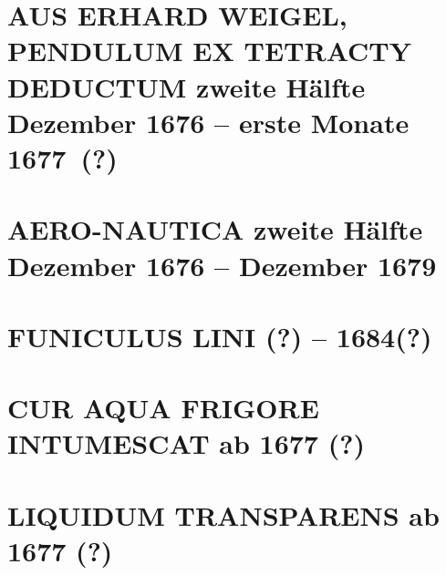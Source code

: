 \documentclass[%
fontsize=10pt,
]{scrbook}
\DeclareRobustCommand{\bracks}[1]{%
\textup{\lbrack}#1\textup{\rbrack}}
\begin{document}
\chapter[tocentry={Aus Erhard Weigel, Pendulum ex tetracty deductum 
\enskip \bracks{zweite Hälfte Dezember 1676 -- erste Monate 1677~(?)}},
head={Aus Erhard Weigel, Pendulum ex tetracty deductum}]%
{\MakeUppercase{Aus Erhard Weigel, Pendulum ex tetracty deductum}
\newline \bracks{zweite Hälfte Dezember 1676 -- erste Monate 1677~(?)}}
\label{38575}




\chapter[tocentry={Aero-nautica 
\enskip\bracks{zweite Hälfte Dezember 1676 -- Dezember 1679}},
head={Aero-nautica }]%
{\MakeUppercase{Aero-nautica}
\newline\bracks{zweite Hälfte Dezember 1676 -- Dezember 1679}}
\label{56215}




\chapter[tocentry={Funiculus Lini 
\enskip\lbrack%
1677\;(?) -- 1684\;(?)%
\rbrack},
head={Funiculus Lini}]%
{\MakeUppercase{Funiculus Lini}
\newline{}\;(?) -- 1684\;(?)%
\rbrack}%
\label{60261}




\chapter[tocentry={Cur aqua frigore intumescat %
\enskip\bracks{%
ab 1677 (?)%
}}, %
head={Cur aqua frigore intumescat%
}]%
{\MakeUppercase{Cur aqua frigore intumescat} %
\newline\bracks{%
ab 1677 (?)%
}}%
\label{60248}




\chapter[tocentry={Liquidum transparens %
\enskip\bracks{%
ab 1677 (?)%
}}, %
head={Liquidum transparens%
}]%
{\MakeUppercase{Liquidum transparens} %
\newline\bracks{%
ab 1677 (?)%
}}%
\label{60255}

\end{document}
